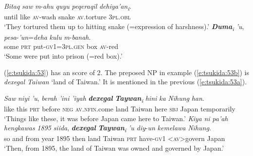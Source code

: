 \documentclass[output=paper
,modfonts
,nonflat]{langsci/langscibook}
\begin{document}
\begin{exe}
	\label{e:tsukida:52}
	\begin{xlist}
		\ex\label{e:tsukida:52a}
		\gll  \textit{Bitaq} \textit{saw}    \textit{m}-\textit{ahu}     \textit{quyu}  \textit{peqeraqil}  \textit{dehiya'an}\textit{\textsubscript{i}}.\\
		until   like \textsc{av}-wash   snake \textsc{av}.torture \textsc{3pl}.\textsc{obl}\\
		\glt ‘They tortured them up to hitting snake (=expression of harshness).’
		\ex\label{e:tsukida:52b}
		\gll  \textbf{\textit{Duma}}\textit{\textsubscript{i}} \textit{'u},   \textit{pesa}-\textit{'un}=\textit{deha}    \textit{kulu}  \textit{m}-\textit{banah}.\\
		some \textsc{prt} put-\textsc{gv1}=\textsc{3pl}.\textsc{gen} box \textsc{av}-red\\
		\glt ‘Some were put into prison (=red box).’
	\end{xlist}
\end{exe}

\noindent
(\ref{e:tsukida:53}) has an  score of 2. The preposed NP in example (\ref{e:tsukida:53b}) is \textit{dexegal Taiwan} ‘land of Taiwan.’ It is mentioned in the previous  (\ref{e:tsukida:53a}). 

\begin{exe}
	\label{e:tsukida:53}
	\begin{xlist}
		\ex\label{e:tsukida:53a}
		\gll  \textit{Saw}   \textit{niyi}  \textit{'u},   \textit{berah}  \textit{'ini}   \textit{'iyah} \textbf{\textit{dexegal}}  \textbf{\textit{Taywan}}\textit{\textsubscript{i}} \textit{hini}  \textit{ka}  \textit{Nihung}  \textit{han}.\\
		like   this \textsc{prt} before \textsc{neg} \textsc{av}.\textsc{nfin}.come  land Taiwan  here \textsc{sbj} Japan temporarily\\
		\glt ‘Things like these, it was before Japan came here to Taiwan.’
		\ex\label{e:tsukida:53b}
		\gll  \textit{Kiya}  \textit{ni}  \textit{pa'ah}  \textit{hengkawas}  \textit{1895}  \textit{siida}, \textbf{\textit{dexegal}}   \textbf{\textit{Taywan}}\textit{\textsubscript{i}} \textit{'u}     \textit{diy}-\textit{un}      \textit{k}{\USSmaller}\textit{em}{\USGreater}\textit{elawa}  \textit{Nihung}.\\
		so     and   from    year       1895   then    land       Taiwan \textsc{prt} have-\textsc{gv1} <\textsc{av}>govern   Japan\\
		\glt ‘Then, from 1895, the land of Taiwan was owned and governed by Japan.’
	\end{xlist}
\end{exe}
\end{document}
